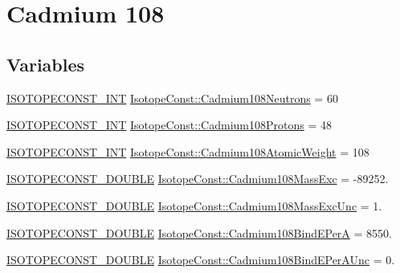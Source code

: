 \hypertarget{group___isotope_const-_cadmium-_cd108}{}\section{Cadmium 108}
\label{group___isotope_const-_cadmium-_cd108}
\subsection*{Variables}
\begin{DoxyCompactItemize}
\item 
\mbox{\hyperlink{group___isotope_const-_macros_ga5f18360b3e99483a35c32d789e62621c}{I\+S\+O\+T\+O\+P\+E\+C\+O\+N\+S\+T\+\_\+\+I\+NT}} \mbox{\hyperlink{group___isotope_const-_cadmium-_cd108_gaa167105dfa4329f5e0b6fc468e3c8907}{Isotope\+Const\+::\+Cadmium108\+Neutrons}} = 60
\item 
\mbox{\hyperlink{group___isotope_const-_macros_ga5f18360b3e99483a35c32d789e62621c}{I\+S\+O\+T\+O\+P\+E\+C\+O\+N\+S\+T\+\_\+\+I\+NT}} \mbox{\hyperlink{group___isotope_const-_cadmium-_cd108_ga32384b59836e8aa7c946db3622524950}{Isotope\+Const\+::\+Cadmium108\+Protons}} = 48
\item 
\mbox{\hyperlink{group___isotope_const-_macros_ga5f18360b3e99483a35c32d789e62621c}{I\+S\+O\+T\+O\+P\+E\+C\+O\+N\+S\+T\+\_\+\+I\+NT}} \mbox{\hyperlink{group___isotope_const-_cadmium-_cd108_gadc36c89b4044a011b0975d77445120d3}{Isotope\+Const\+::\+Cadmium108\+Atomic\+Weight}} = 108
\item 
\mbox{\hyperlink{group___isotope_const-_macros_ga8f45a7272ce02c0b4c65c44636ed719a}{I\+S\+O\+T\+O\+P\+E\+C\+O\+N\+S\+T\+\_\+\+D\+O\+U\+B\+LE}} \mbox{\hyperlink{group___isotope_const-_cadmium-_cd108_gaa2db459dc4b92c1cdd89e5a7cf1d536f}{Isotope\+Const\+::\+Cadmium108\+Mass\+Exc}} = -\/89252.
\item 
\mbox{\hyperlink{group___isotope_const-_macros_ga8f45a7272ce02c0b4c65c44636ed719a}{I\+S\+O\+T\+O\+P\+E\+C\+O\+N\+S\+T\+\_\+\+D\+O\+U\+B\+LE}} \mbox{\hyperlink{group___isotope_const-_cadmium-_cd108_ga7183dadc92db5611fdd9f891478168bd}{Isotope\+Const\+::\+Cadmium108\+Mass\+Exc\+Unc}} = 1.
\item 
\mbox{\hyperlink{group___isotope_const-_macros_ga8f45a7272ce02c0b4c65c44636ed719a}{I\+S\+O\+T\+O\+P\+E\+C\+O\+N\+S\+T\+\_\+\+D\+O\+U\+B\+LE}} \mbox{\hyperlink{group___isotope_const-_cadmium-_cd108_ga8949bc4e472612179144539664686152}{Isotope\+Const\+::\+Cadmium108\+Bind\+E\+PerA}} = 8550.
\item 
\mbox{\hyperlink{group___isotope_const-_macros_ga8f45a7272ce02c0b4c65c44636ed719a}{I\+S\+O\+T\+O\+P\+E\+C\+O\+N\+S\+T\+\_\+\+D\+O\+U\+B\+LE}} \mbox{\hyperlink{group___isotope_const-_cadmium-_cd108_gab536d15718df90a1838f502ff0ec3fc6}{Isotope\+Const\+::\+Cadmium108\+Bind\+E\+Per\+A\+Unc}} = 0.

\end{DoxyCompactItemize}
